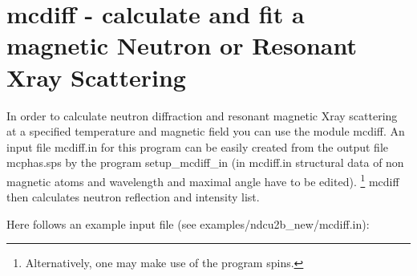 \section{{\prg mcdiff} - calculate and fit a magnetic Neutron or Resonant Xray %
Scattering}\label{mcdiff}

In order to calculate neutron diffraction and resonant magnetic Xray scattering
at a specified temperature and magnetic field you can use the module {\prg mcdiff}.
An input file {\prg mcdiff.in } for this program can be easily created from
the output file {\prg mcphas.sps} by the program {\prg setup\_mcdiff\_in}
(in {\prg mcdiff.in } structural data of non magnetic atoms and wavelength
                        and maximal angle have to be edited).
\footnote{Alternatively, one may make use of the program {\prg spins}.} 
{\prg mcdiff} then calculates neutron reflection and intensity list.

Here follows an example input file (see examples/ndcu2b\_new/mcdiff.in):

